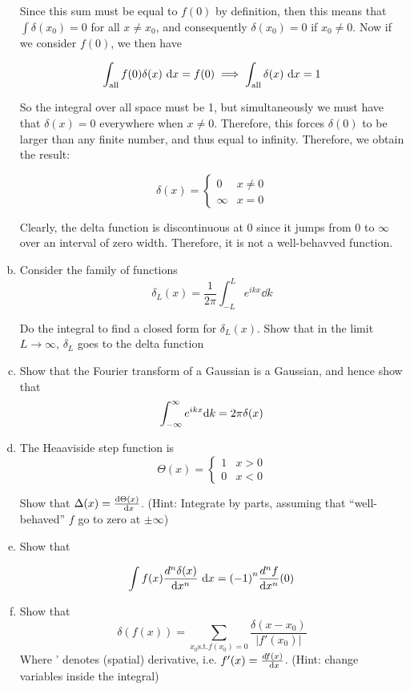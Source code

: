 \documentclass[10pt]{article}
\begin{document}
\begin{enumerate}[(a)]
\begin{solution}
            Since this sum must be equal to $f(0)$ by definition, then this means that $\int \delta(x_0) = 0$ for all $x \neq x_0$, and consequently $\delta(x_0) = 0$ if $x_0 \neq 0$. Now if we consider $f(0)$, we then have 

            \[ \int_{\text{all}} f(0) \delta(x) \ \dd x = f(0) \implies \int_{\text{all}} \delta(x) \ \dd x = 1\] 

            So the integral over all space must be 1, but simultaneously we must have that $\delta(x) = 0$ everywhere when $x \neq 0$. Therefore, this forces $\delta(0)$ to be larger than any finite number, and thus equal to infinity. Therefore, we obtain the result: 

            \[ \delta(x) = \begin{cases}
                0 & x \neq 0\\
                \infty & x = 0
            \end{cases}\]

            Clearly, the delta function is discontinuous at 0 since it jumps from 0 to $\infty$ over an interval of zero width. Therefore, it is not a well-behavved function. 
            
        \end{solution}
        \item Consider the family of functions 
        \[ \delta_L (x) = \frac{1}{2\pi} \int_{-L}^L e^{ikx} \dd k\] 

        Do the integral to find a closed form for $\delta_L(x)$. Show that in the limit $L \to \infty$, $\delta_L$ goes to the delta function
        \item Show that the Fourier transform of a Gaussian is a Gaussian, and hence show that 
        \[ \int_{-\infty}^{\infty} e^{ikx} \dd k = 2\pi \delta(x)\]
        \item The Heaaviside step function is 
        \[ \Theta(x) = \begin{cases}
            1 & x > 0\\
            0 & x < 0
        \end{cases}\]

        Show that $\Delta(x) = \frac{\dd \Theta(x)}{\ \dd x}$. (Hint: Integrate by parts, assuming that ``well-behaved'' $f$ go to zero at $\pm \infty$)
        \item Show that 

        \[ \int f(x) \frac{d^n \delta(x)}{\dd x^n} \ \dd x = {(-1)}^{n} \frac{d^n f}{\dd x^n}(0)\]
        \item Show that 
        \[ \delta(f(x)) = \sum_{x_0 \text{s.t.} f(x_0) = 0} \frac{\delta(x - x_0)}{|f'(x_0)|}\] 
        Where ' denotes (spatial) derivative, i.e. $f'(x) = \frac{df(x)}{\ \dd x}$. (Hint: change variables inside the integral)
    \end{enumerate}
    \pagebreak
\end{document}
